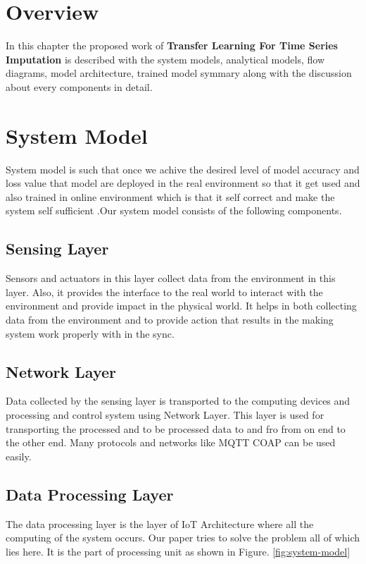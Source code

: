 
\section{Overview}
In this chapter the proposed work of \textbf{Transfer Learning For Time Series Imputation} is described with the system models, analytical models, flow diagrams, model architecture, trained model symmary along with the discussion about every components in detail.

\section{System Model}

System model is such that once we achive the desired level of model accuracy and loss value that model are deployed in the real environment so that it get used and also trained in online environment which is that it self correct and make the system self sufficient .Our system model consists of the following components.

\subsection{Sensing Layer}
Sensors and actuators in this layer collect data from the environment in this layer.
Also, it provides the interface to the real world to interact with the environment and provide impact in the physical world. It helps in both collecting data from the environment and to provide action that results in the making system work properly with in the sync.

\subsection{Network Layer}
Data collected by the sensing layer is transported to the computing devices and processing and control system using Network Layer. This layer is used for transporting the processed and to be processed data to and fro from on end to the other end. Many protocols and networks like MQTT COAP can be used easily.

\subsection{Data Processing Layer}
The data processing layer is the layer of IoT Architecture where all the computing of the system occurs. Our paper tries to solve the problem all of which lies here. It is the part of processing unit as shown in Figure. \ref{fig:system-model}

